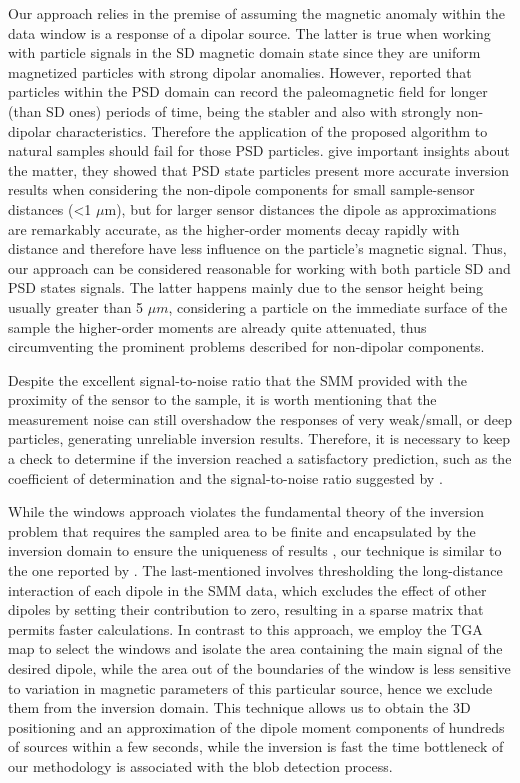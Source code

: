 Our approach relies in the premise of assuming the magnetic anomaly within
the data window is a response of a dipolar source.
The latter is true when working
with particle signals in the SD magnetic domain state since they are uniform magnetized particles with strong dipolar anomalies.
However, \cite{Nagy2017} reported that particles within the PSD domain can record the paleomagnetic field for longer (than SD ones) periods of time, being the stabler and also with strongly non-dipolar characteristics.
Therefore the application of the proposed algorithm to natural samples should fail for those PSD particles.
\cite{CortesOrtuno2022} give important insights about the matter, they showed that PSD state particles present more accurate inversion results when considering the non-dipole components for small sample-sensor distances (\textless 1 $\mu$m), but for larger sensor distances the dipole as approximations are remarkably accurate, as the higher-order moments decay rapidly with distance and therefore have less
influence on the particle's magnetic signal.
Thus, our approach can be considered reasonable for working with both particle SD and PSD states signals.
The latter happens mainly due to the sensor height being usually greater than 5 $\mu m$, considering a particle on the immediate surface of the sample the higher-order moments are already quite attenuated, thus circumventing the prominent problems described for non-dipolar components.

Despite the excellent signal-to-noise ratio that the SMM provided with the
proximity of the sensor to the sample, it is worth mentioning that the
measurement noise can still overshadow the responses of very weak/small, or
deep particles, generating unreliable inversion results.
Therefore, it is necessary to keep a check to determine if the inversion reached a satisfactory prediction, such as the coefficient of determination and the
signal-to-noise ratio suggested by \citep{CortesOrtuno2021}.

While the windows approach violates the fundamental theory of the inversion problem that  requires the sampled area to be finite and encapsulated by the inversion domain to ensure the uniqueness of results \citep{Baratchart2013,Lima2013}, our technique is similar to the  one reported by \cite{Weiss2007}.
The last-mentioned involves thresholding the long-distance interaction
of each dipole in the SMM data, which excludes the effect of other dipoles by setting their contribution to zero, resulting in a sparse matrix that permits faster calculations.
In contrast to this approach, we employ the TGA map to select the windows and isolate the area containing the main signal of the desired dipole, while the area out of the boundaries of the window is less sensitive to variation in magnetic parameters of this particular source, hence we exclude them from the inversion domain.
This technique allows us to obtain the 3D positioning and an approximation of the dipole moment components of hundreds of sources within a few seconds, while the inversion is fast the time bottleneck of our methodology is associated with the blob detection process.


